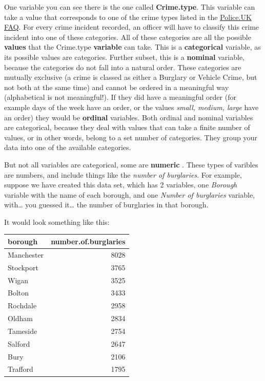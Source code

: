 \documentclass[]{book}
\theoremstyle{definition}
\theoremstyle{definition}
\theoremstyle{definition}
\theoremstyle{remark}
\begin{document}
One variable you can see there is the one called \textbf{Crime.type}.
This variable can take a value that corresponds to one of the crime
types listed in the
\href{https://www.police.uk/about-this-site/faqs/\#what-do-the-crime-categories-mean}{Police.UK
FAQ}. For every crime incident recorded, an officer will have to
classify this crime incident into one of these categories. All of these
categories are all the possible \textbf{values} that the Crime.type
\textbf{variable} can take. This is a \textbf{categorical} variable, as
its possible values are categories. Further subset, this is a
\textbf{nominal} variable, because the categories do not fall into a
natural order. These categories are mutually exclusive (a crime is
classed as either a Burglary or Vehicle Crime, but not both at the same
time) and cannot be ordered in a meaningful way (alphabetical is not
meaningful!). If they did have a meaningful order (for example days of
the week have an order, or the values \emph{small, medium, large} have
an order) they would be \textbf{ordinal} variables. Both ordinal and
nominal variables are categorical, because they deal with values that
can take a finite number of values, or in other words, belong to a set
number of categories. They group your data into one of the available
categories.

But not all variables are categorical, some are \textbf{numeric} . These
types of varibles are numbers, and include things like the \emph{number
of burglaries}. For example, suppose we have created this data set,
which has 2 variables, one \emph{Borough} variable with the name of each
borough, and one \emph{Number of burglaries} variable, with\ldots{} you
guessed it\ldots{} the number of burglaries in that borough.

It would look something like this:

\begin{tabular}{l|r}
\hline
borough & number.of.burglaries\\
\hline
Manchester & 8028\\
\hline
Stockport & 3765\\
\hline
Wigan & 3525\\
\hline
Bolton & 3433\\
\hline
Rochdale & 2958\\
\hline
Oldham & 2834\\
\hline
Tameside & 2754\\
\hline
Salford & 2647\\
\hline
Bury & 2106\\
\hline
Trafford & 1795\\
\hline
\end{tabular}
\end{document}
